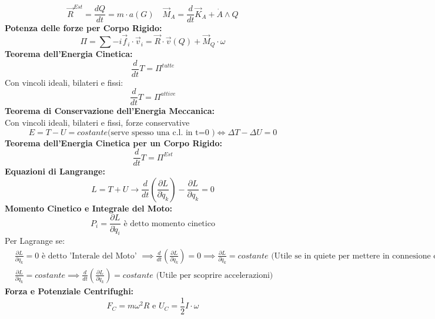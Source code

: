 \documentclass[a4paper]{report}
\begin{document}
\[
\vec{R}^{Est}=\frac{dQ}{dt}= m\cdot a(G) \quad \vec{M}_A = \frac{d}{dt}\vec{K}_A+\dot{A}\wedge Q
\]
\textbf{Potenza delle forze per Corpo Rigido:}
\[
\Pi = \sum-i \vec{f}_i \cdot \vec{v}_i = \vec{R}\cdot\vec{v}(Q)+\vec{M}_Q\cdot \omega   
\]
\textbf{Teorema dell'Energia Cinetica:}\\
\[
    \frac{d}{dt}T = \Pi^{tutte}
\]
Con vincoli ideali, bilateri e fissi:
\[
\frac{d}{dt}T=\Pi^{attive}    
\]
\textbf{Teorema di Conservazione dell'Energia Meccanica:}\\
Con vincoli ideali, bilateri e fissi, forze conservative
\[
  E=T-U=costante \text{(serve spesso una c.l. in t=0 )} \iff \Delta T - \Delta U = 0  
\]
\textbf{Teorema dell'Energia Cinetica per un Corpo Rigido:}
\[
    \frac{d}{dt}T = \Pi^{Est}
\]
\textbf{Equazioni di Langrange:}
\[
    L=T+U \longrightarrow \frac{d}{dt}\left(\frac{\partial L}{\partial \dot{q}_k}\right) - \frac{\partial L}{\partial q_k}=0
\]
\textbf{Momento Cinetico e Integrale del Moto:}
\[
    P_i = \frac{\partial L}{\partial \dot{q}_i} \text{ è detto momento cinetico} 
\]
Per Lagrange se:
\begin{align*}
&\frac{\partial L}{\partial q_k}=0 \text{ è detto 'Interale del Moto' } \implies \frac{d}{dt}\left(\frac{\partial L}{\partial \dot{q}_k}\right)=0 \implies \frac{\partial L}{\partial \dot{q}_k}=costante \text{  (Utile se in quiete per mettere in connesione due velocità)}\\
&\frac{\partial L}{\partial q_k}=costante \implies \frac{d}{dt}\left(\frac{\partial L}{\partial \dot{q}_k}\right)= costante\text{  (Utile per scoprire accelerazioni)} 
\end{align*}
\textbf{Forza e Potenziale Centrifughi:}
\[
F_C = m \omega^2 R \text{ e } U_C = \frac{1}{2} I\cdot \omega    
\]
\end{document}
